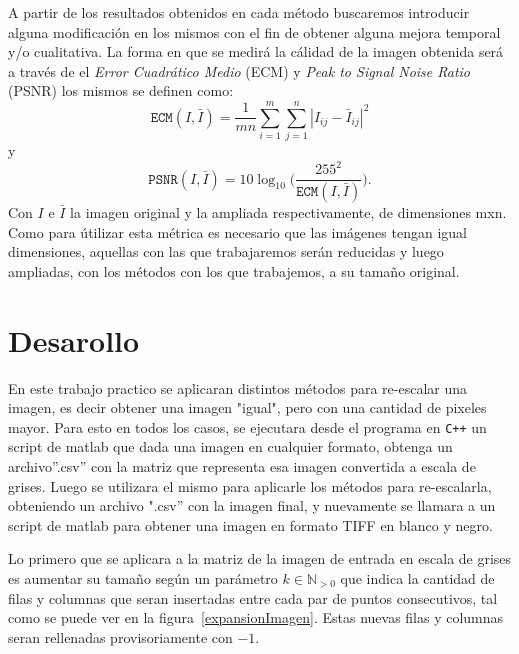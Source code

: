\documentclass[a4paper]{article}
\newcounter{col}
\begin{document}
A partir de los resultados obtenidos en cada método buscaremos introducir alguna modificación en los mismos con el fin de obtener alguna mejora temporal y/o cualitativa. La forma en que se medirá la cálidad de la imagen obtenida será a través de el \emph{Error Cuadr\'atico Medio} (ECM) y \emph{Peak to Signal Noise Ratio} (PSNR) los mismos se definen como:
\begin{equation}
\texttt{ECM}(I,\bar{I}) = \frac{1}{mn}\sum_{i=1}^m\sum_{j = 1}^n |I_{ij} - \bar{I}_{ij}|^2 \label{eq:ecm}
\end{equation}
\noindent y
\begin{equation}
\texttt{PSNR}(I,\bar{I}) = 10 \log_{10}\bigg(\frac{255^2}{\texttt{ECM}(I,\bar{I})}\bigg). \label{eq:psnr}
\end{equation}  
Con $I$ e $\bar{I}$ la imagen original y la ampliada respectivamente, de dimensiones mxn. Como para útilizar esta métrica es necesario que las imágenes tengan igual dimensiones, aquellas con las que trabajaremos serán reducidas y luego ampliadas, con los métodos con los que trabajemos, a su tamaño original. 


\newpage 

\section{Desarollo}

En este trabajo practico se aplicaran distintos métodos para re-escalar una imagen, es decir obtener una imagen "igual", pero con una cantidad de pixeles mayor. Para esto en todos los casos, se ejecutara desde el programa en \verb-C++- un script de matlab que dada una imagen en cualquier formato, obtenga un archivo''.csv'' con la matriz que representa esa imagen convertida a escala de grises. Luego se utilizara el mismo para aplicarle los métodos para re-escalarla, obteniendo un archivo ".csv'' con la imagen final, y nuevamente se llamara a un script de matlab para obtener una imagen en formato TIFF en blanco y negro.

Lo primero que se aplicara a la matriz de la imagen de entrada en escala de grises es aumentar su tamaño según un parámetro $k \in \mathbb{N}_{>0}$ que indica la cantidad de filas y columnas que seran insertadas entre cada par de puntos consecutivos, tal como se puede ver en la figura~\ref{expansionImagen}. Estas nuevas filas y columnas seran rellenadas provisoriamente con $ -1 $.
\end{document}
